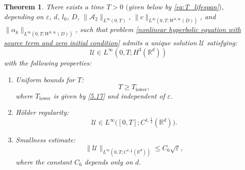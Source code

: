 \documentclass[11pt,reqno,oneside]{amsart}
\numberwithin{equation}{section}
\newtheorem{theorem}{Theorem}[section]
\theoremstyle{definition}
\theoremstyle{remark}
\numberwithin{equation}{section}
\begin{document}
	\begin{theorem}\label{thm:5.2}
		There exists a time $ T > 0 $ $($given below by \eqref{eq:T_lifespan}$)$, depending on $ \varepsilon $, $ d $, $ l_0 $, $ D $, $ \|\mathscr{A}_2\|_{L^{\infty}(0,T)} $, $ \| c\|_{L^{\infty}(0,T; W^{3,\infty}(D))} $, and $\|\alpha_k\|_{L^{\infty}(0,T; W^{3,\infty}(D))} $, such that problem \eqref{nonlinear hyperbolic equation with source term and zero initial condition} admits a unique solution $ \mathscr{U} $ satisfying:
		$$
		\mathscr{U} \in L^{\infty}(0, T; H^3(\mathbb{R}^d)) 
		$$
		with the following properties:
		\begin{enumerate}
			\item Uniform bounds for $T$: 
			$$
			T\geqslant T_{\mathrm{lower}} 	,
			$$
			where $T_{\mathrm{lower}}$ is given by \eqref{5.17}  and independent of $\varepsilon$.
			\item  H\"older regularity:
			$$
			\mathscr{U} \in L^{\infty}\big([0,T]; C^{1,\frac{1}{2}}(\mathbb{R}^d)\big).
			$$
			\item Smallness estimate:
			$$
			\|\mathscr{U}\|_{L^{\infty}(0,T;C^{1,\frac{1}{2}}(\mathbb{R}^d)) }\leqslant C_6 \sqrt{\varepsilon},
			$$
			where the constant $C_6$ depends only on $d$.
		\end{enumerate}
	\end{theorem}
\end{document}
